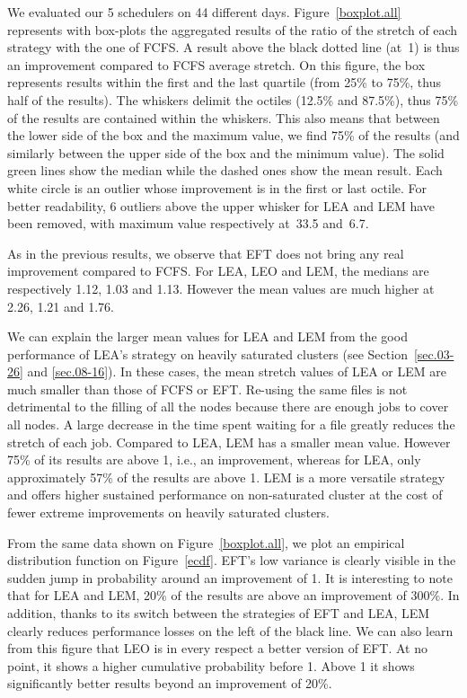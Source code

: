 \documentclass[sigconf,review,anonymous]{acmart}
\begin{document}
We evaluated our 5 schedulers on 44 different days.
Figure~\ref{boxplot.all} represents with box-plots the aggregated
results of the ratio of the stretch of each strategy with the one of FCFS. A result above the black dotted line (at~1) is thus an improvement compared to FCFS average stretch.
On this figure, the box represents results within the first and the last quartile (from 25\% to 75\%, thus half of the results).
The whiskers delimit the octiles (12.5\% and 87.5\%), thus 75\% of the results are contained
within the whiskers. This also means that between the lower side of the box and the maximum value,
we find 75\% of the results (and similarly between the upper side of the box and the minimum value).
The solid green lines show the median while the dashed ones show the mean result.
Each white circle is an outlier whose improvement is in the first or last octile.
For better readability, 6 outliers above the upper whisker for LEA and
LEM have been removed, with maximum value respectively at~33.5
and~6.7.

As in the previous results, we observe that EFT does not bring any real improvement compared to FCFS.
For LEA, LEO and LEM, the medians are respectively 1.12, 1.03 and 1.13. 
However the mean values are much higher at 2.26, 1.21 and 1.76.

We can explain the larger mean values for LEA and LEM from the good performance of LEA's strategy
on heavily saturated clusters (see Section~\ref{sec.03-26} and \ref{sec.08-16}).
In these cases, the mean stretch values of LEA or LEM are much smaller than those of FCFS or EFT.
Re-using the same files is not detrimental to the filling of all the nodes because there are 
enough jobs to cover all nodes.
A large decrease in the time spent waiting for a file greatly reduces the stretch of each job.
Compared to LEA, LEM has a smaller mean value.
However 75\% of its results are above 1, i.e., an improvement, whereas for LEA, only approximately 57\% of the results are above 1. 
LEM is a more versatile strategy and offers higher sustained performance on non-saturated cluster at the cost
of fewer extreme improvements on heavily saturated clusters.


From the same data shown on Figure~\ref{boxplot.all}, we plot an empirical distribution function on Figure~\ref{ecdf}.
EFT's low variance is clearly visible in the sudden jump in probability around an improvement of 1.
It is interesting to note that for LEA and LEM, 20\% of the results are above an improvement of 300\%.
In addition, thanks to its switch between the strategies of EFT and LEA, LEM clearly reduces
performance losses on the left of the black line.
We can also learn from this figure that LEO is in every respect a better version of EFT.
At no point, it shows a higher cumulative probability before 1. Above 1 it shows significantly better
results beyond an improvement of 20\%.
\end{document}

